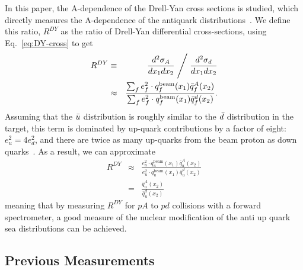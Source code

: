 In this paper, the A-dependence of the Drell-Yan cross sections is studied, which directly measures the A-dependence of the antiquark distributions~\cite{Berger:1985dr}. We define this ratio, $R^{DY}$ as the ratio of Drell-Yan differential cross-sections, using Eq.~\ref{eq:DY-cross} to get
\begin{eqnarray}
	R^{DY} & \equiv & \frac{d^2\sigma_A}{dx_1 dx_2} \Biggm/ \frac{d^2\sigma_d}{dx_1 dx_2} \\
	 & \approx & \frac{\sum_f e_f^2 \cdot q_f^{\text{beam}}(x_1) \bar{q}_f^A(x_2)}{\sum_f e_f^2 \cdot q_f^{\text{beam}}(x_1) \bar{q}_f^d(x_2)}.
\end{eqnarray}
Assuming that the $\bar{u}$ distribution is roughly similar to the $\bar{d}$ distribution in the target, this term is dominated by up-quark contributions by a factor of eight: $e_u^2 = 4 e_d^2$, and there are twice as many up-quarks from the beam proton as down quarks~\cite{Geesaman:1995yd}. As a result, we can approximate
\begin{eqnarray}
	R^{DY} & \approx & \frac{e_u^2 \cdot q_u^{\text{beam}}(x_1) \bar{q}^A_u(x_2)}{e_u^2 \cdot q_u^{\text{beam}}(x_1) \bar{q}^d_u(x_2)} \\ 
	& = & \frac{\bar{q}_u^A(x_2)}{\bar{q}_u^d(x_2)}
\end{eqnarray}
meaning that by measuring $R^{DY}$ for $pA$ to $pd$ collisions with a forward spectrometer, a good measure of the nuclear modification of the anti up quark sea distributions can be achieved.

\subsection{Previous Measurements}

